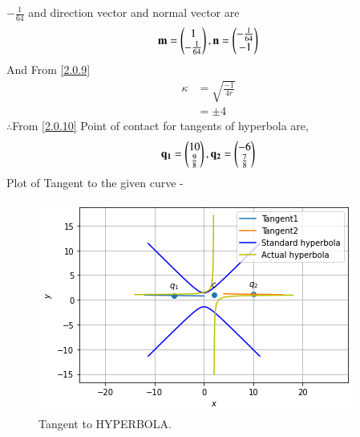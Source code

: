 \documentclass[journal,12pt,twocolumn]{IEEEtran}
\begin{document}
$-\frac{1}{64}$ and direction vector and normal vector are
\begin{align}
\mathbf{m}=\begin{pmatrix}1\\-\frac{1}{64}\end{pmatrix},\mathbf{n}=\begin{pmatrix}-\frac{1}{64}\\-1\end{pmatrix}
\end{align}
And From \eqref{2.0.9}
\begin{align}
\kappa &= \sqrt{\frac{-1}{4r}} \\
&=\pm 4
\end{align}
$\therefore$From \eqref{2.0.10} Point of contact for tangents of hyperbola are,
\begin{align}
  \mathbf{q_1}=\begin{pmatrix}10\\\frac{9}{8}\end{pmatrix},\mathbf{q_2}=\begin{pmatrix}-6\\\frac{7}{8}\end{pmatrix}
\end{align}
Plot of Tangent to the given curve -
\begin{figure}[!ht]
    \centering
    \includegraphics[width=\columnwidth]{HYPERBOLA.png}
    \caption{Tangent to HYPERBOLA.}
    \label{fig:Tangent to HYPERBOLA.}
\end{figure}  
\end{document}
